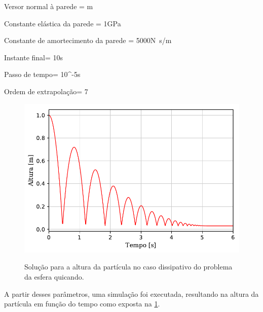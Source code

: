 \begin{table}[h]
\begin{parametersdesc}{\textwidth}
	\item{Versor normal à parede}{\ind{\planeNormalVersor}{\element} = }{\si\metre}
	\item{Constante elástica da parede}{\ind{\elasticModulus}{\element} = 1}{\si[per-mode=symbol]{\giga\pascal}}
	\item{Constante de amortecimento da parede}{\ind{\normalDampingConstant}{\element} = \SI{5000}{}}{\si[per-mode=symbol]{\newton\second\per\meter}}
	\hline
	\item{Instante final}{\finalInstant = 10}{\si\second} 
	\item{Passo de tempo}{\Dt = 10^{-5}}{\si\second}
	\item{Ordem de extrapolação}{\taylorOrder = 7}{\emptyUnit}
\end{parametersdesc}
\sourceMe 
\end{table}

\begin{figure}[htb!]
	\caption{Solução para a altura da partícula no caso dissipativo do problema da esfera quicando.}
	\centering
		\includegraphics[scale=1]{images/bouncing_sphere/dissipative/y_position.pdf}
	\label{fig:bouncing_sphere_y_position}
	\sourceMe
\end{figure}

A partir desses parâmetros, uma simulação foi executada, resultando na altura da partícula em função do tempo como exposta na \cref{fig:bouncing_sphere_y_position}.

